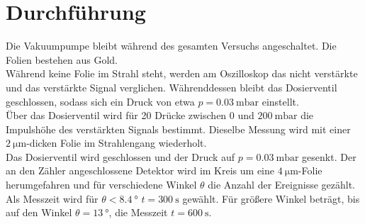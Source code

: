 \section{Durchführung}
\label{sec:Durchführung}

Die Vakuumpumpe bleibt während des gesamten Versuchs angeschaltet.
Die Folien bestehen aus Gold.\\
\newline
Während keine Folie im Strahl steht, werden am Oszilloskop das nicht verstärkte und das verstärkte Signal verglichen. Währenddessen bleibt das Dosierventil geschlossen, sodass sich ein Druck von etwa $p=\SI{0,03}{\milli\bar}$ einstellt.\\
Über das Dosierventil wird für 20 Drücke zwischen $0$ und $\SI{200}{\milli\bar}$ die Impulshöhe des verstärkten Signals bestimmt.
Dieselbe Messung wird mit einer $\SI{2}{\micro\meter}$-dicken Folie im Strahlengang wiederholt.\\
Das Dosierventil wird geschlossen und der Druck auf $p=\SI{0,03}{\milli\bar}$ gesenkt.
Der an den Zähler angeschlossene Detektor wird im Kreis um eine $\SI{4}{\micro\meter}$-Folie herumgefahren und für verschiedene Winkel $\theta$ die Anzahl der Ereignisse gezählt. Als Messzeit wird für $\theta<\SI{8,4}{\degree}$ $t=\SI{300}{\second}$ gewählt. Für größere Winkel beträgt, bis auf den Winkel $\theta=\SI{13}{\degree}$, die Messzeit $t=\SI{600}{\second}$.


